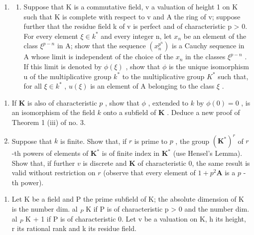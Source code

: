 \begin{enumerate}
\def\labelenumi{\arabic{enumi}.}
\setcounter{enumi}{4}
\tightlist
\item
  \begin{enumerate}
  \def\labelenumii{(\alph{enumii})}
  \tightlist
  \item
    Suppose that K is a commutative field, v a valuation of height 1 on K such that K is complete with respect to v and A the ring of v; suppose further that the residue field k of v is perfect and of characteristic p \textgreater{} 0. For every element \(\xi \in k^{*}\) and every integer n, let \(x_{n}\) be an element of the class \(\xi^{p-n}\) in A; show that the sequence \((x_{n}^{p^{n}})\) is a Cauchy sequence in A whose limit is independent of the choice of the \(x_{n}\) in the classes \(\xi^{p-n}\) . If this limit is denoted by \(\phi(\xi)\) , show that \(\phi\) is the unique isomorphism u of the multiplicative group \(k^{*}\) to the multiplicative group \(K^{*}\) such that, for all \(\xi \in k^{*}\) , \(u(\xi)\) is an element of A belonging to the class \(\xi\) .
  \end{enumerate}
\end{enumerate}

\begin{enumerate}
\def\labelenumi{(\alph{enumi})}
\setcounter{enumi}{1}
\item
  If \(\mathbf{K}\) is also of characteristic \(p\) , show that \(\phi\) , extended to \(k\) by \(\phi(0) = 0\) , is an isomorphism of the field \(k\) onto a subfield of \(\mathbf{K}\) . Deduce a new proof of Theorem 1 (iii) of no. 3.
\item
  Suppose that \(k\) is finite. Show that, if \(r\) is prime to \(p\) , the group \((\mathbf{K}^*)^r\) of \(r\) -th powers of elements of \(\mathbf{K}^*\) is of finite index in \(\mathbf{K}^*\) (use Hensel's Lemma). Show that, if further \(v\) is discrete and \(\mathbf{K}\) of characteristic 0, the same result is valid without restriction on \(r\) (observe that every element of \(1 + p^2\mathbf{A}\) is a \(p\) -th power).
\end{enumerate}


\begin{enumerate}
\def\labelenumi{\arabic{enumi}.}
\tightlist
\item
  Let K be a field and P the prime subfield of K; the absolute dimension of K is the number dim. al \(_{P}\) K if P is of characteristic p \textgreater{} 0 and the number dim. al \(_{P}\) K + 1 if P is of characteristic 0. Let v be a valuation on K, h its height, r its rational rank and k its residue field.
\end{enumerate}

